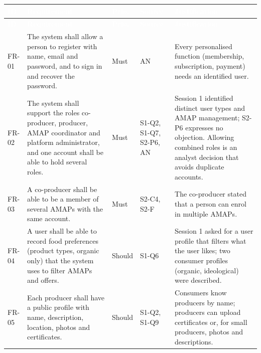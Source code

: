 \documentclass[11pt,a4paper]{article}
\begin{document}
{\footnotesize
\begin{longtable}{>{\raggedright\arraybackslash\hspace{0pt}}p{}>{\raggedright\arraybackslash\hspace{0pt}}p{}>{\raggedright\arraybackslash\hspace{0pt}}p{}>{\raggedright\arraybackslash\hspace{0pt}}p{}>{\raggedright\arraybackslash\hspace{0pt}}p{}}
\rowcolor{hdr}\textcolor{white}{\textbf{ID}} & \textcolor{white}{\textbf{Requirement}} & \textcolor{white}{\textbf{Prio.}} & \textcolor{white}{\textbf{Source}} & \textcolor{white}{\textbf{Justification}} \\ \endfirsthead
\rowcolor{hdr}\textcolor{white}{\textbf{ID}} & \textcolor{white}{\textbf{Requirement}} & \textcolor{white}{\textbf{Prio.}} & \textcolor{white}{\textbf{Source}} & \textcolor{white}{\textbf{Justification}} \\ \endhead
FR-01 & The system shall allow a person to register with name, email and password, and to sign in and recover the password. & Must & AN & Every personalised function (membership, subscription, payment) needs an identified user. \\ \hline
FR-02 & The system shall support the roles co-producer, producer, AMAP coordinator and platform administrator, and one account shall be able to hold several roles. & Must & S1-Q2, S1-Q7, S2-P6, AN & Session 1 identified distinct user types and AMAP management; S2-P6 expresses no objection. Allowing combined roles is an analyst decision that avoids duplicate accounts. \\ \hline
FR-03 & A co-producer shall be able to be a member of several AMAPs with the same account. & Must & S2-C4, S2-F & The co-producer stated that a person can enrol in multiple AMAPs. \\ \hline
FR-04 & A user shall be able to record food preferences (product types, organic only) that the system uses to filter AMAPs and offers. & Should & S1-Q6 & Session 1 asked for a user profile that filters what the user likes; two consumer profiles (organic, ideological) were described. \\ \hline
FR-05 & Each producer shall have a public profile with name, description, location, photos and certificates. & Should & S1-Q2, S1-Q9 & Consumers know producers by name; producers can upload certificates or, for small producers, photos and descriptions. \\ \hline
\end{longtable}}
\addtocounter{table}{-1}
\end{document}
